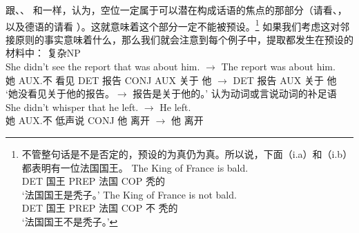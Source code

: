 \noindent
跟\citet{Erteschik81a}、\citet{EL79a}、\citet{Takami88a}
和\citet{vanValin98a}一样，\citet[Section~7.2]{Goldberg2006a}认为，空位一定属于可以潜在构成话语的焦点的那部分（请看、，以及德语的请看
）。这就意味着这个部分一定不能被预设。\footnote{  
不管整句话是不是否定的，预设的为真仍为真。所以说，下面（i.a）和（i.b）都表明有一位法国国王。
  \eal
  \ex 
  \gll The King of France is bald.\\
  DET 国王 PREP 法国 COP 秃的\\
  \glt `法国国王是秃子。'
  \ex 
  \gll The King of France is not bald.\\
  DET 国王 PREP 法国 COP 不 秃的\\
  \glt `法国国王不是秃子。'
  \zllast
}
如果我们考虑这对邻接原则的事实意味着什么，那么我们就会注意到每个例子中，提取都发生在预设的材料中：
\eal
\ex 复杂NP\\
\gll She didn't see the report that was about him. $\to$ The report was about him.\\
她 AUX.不 看见 DET 报告 CONJ AUX 关于 他 $\to$ DET 报告 AUX 关于 他\\
\glt `她没看见关于他的报告。$\to$ 报告是关于他的。'
\ex 认为动词或言说动词的补足语\\
\gll She didn't whisper that he left. $\to$ He left.\\
她 AUX.不 低声说 CONJ 他 离开 $\to$ 他 离开\\
